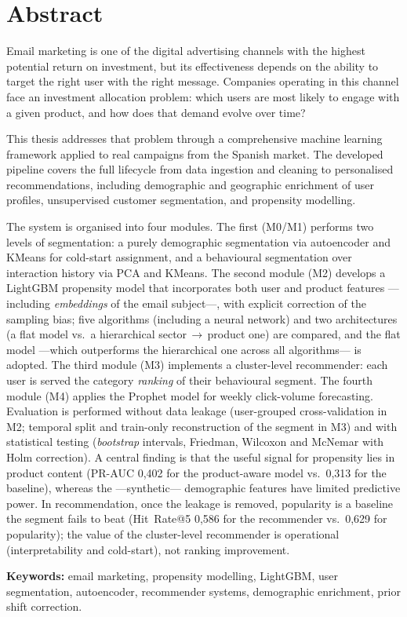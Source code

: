 \chapter*{Abstract}

Email marketing is one of the digital advertising channels with the highest potential return on investment, but its effectiveness depends on the ability to target the right user with the right message. Companies operating in this channel face an investment allocation problem: which users are most likely to engage with a given product, and how does that demand evolve over time?

This thesis addresses that problem through a comprehensive machine learning framework applied to real campaigns from the Spanish market. The developed pipeline covers the full lifecycle from data ingestion and cleaning to personalised recommendations, including demographic and geographic enrichment of user profiles, unsupervised customer segmentation, and propensity modelling.

The system is organised into four modules. The first (M0/M1) performs two levels of segmentation: a purely demographic segmentation via autoencoder and KMeans for cold-start assignment, and a behavioural segmentation over interaction history via PCA and KMeans. The second module (M2) develops a LightGBM propensity model that incorporates both user and product features ---including \textit{embeddings} of the email subject---, with explicit correction of the sampling bias; five algorithms (including a neural network) and two architectures (a flat model vs.\ a hierarchical sector\,$\rightarrow$\,product one) are compared, and the flat model ---which outperforms the hierarchical one across all algorithms--- is adopted. The third module (M3) implements a cluster-level recommender: each user is served the category \textit{ranking} of their behavioural segment. The fourth module (M4) applies the Prophet model for weekly click-volume forecasting. Evaluation is performed without data leakage (user-grouped cross-validation in M2; temporal split and train-only reconstruction of the segment in M3) and with statistical testing (\textit{bootstrap} intervals, Friedman, Wilcoxon and McNemar with Holm correction). A central finding is that the useful signal for propensity lies in product content (PR-AUC 0,402 for the product-aware model vs.\ 0,313 for the baseline), whereas the ---synthetic--- demographic features have limited predictive power. In recommendation, once the leakage is removed, popularity is a baseline the segment fails to beat (Hit~Rate@5 0,586 for the recommender vs.\ 0,629 for popularity); the value of the cluster-level recommender is operational (interpretability and cold-start), not ranking improvement.

\bigskip
\noindent\textbf{Keywords:} email marketing, propensity modelling, LightGBM, user segmentation, autoencoder, recommender systems, demographic enrichment, prior shift correction.
